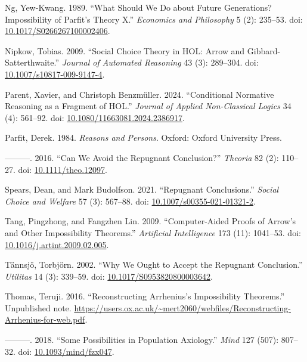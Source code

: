 \documentclass[
  11pt,
  letterpaper,
  DIV=11,
  numbers=noendperiod,
  twoside]{scrartcl}
\newlength{\cslhangindent}
\newenvironment{CSLReferences}[2] %
 {\begin{list}{}{%
  \setlength{\itemindent}{0pt}
  \setlength{\leftmargin}{0pt}
  \setlength{\parsep}{0pt}
  \ifodd #1
   \setlength{\leftmargin}{\cslhangindent}
   \setlength{\itemindent}{-1\cslhangindent}
  \fi
  \setlength{\itemsep}{#2\baselineskip}}}
 {\end{list}}
\begin{document}
\begin{CSLReferences}{1}{0}
Ng, Yew-Kwang. 1989. {``What Should We Do about Future Generations?
{I}mpossibility of {P}arfit's {T}heory {X}.''} \emph{Economics and
Philosophy} 5 (2): 235--53. doi:
\href{https://doi.org/10.1017/S0266267100002406}{10.1017/S0266267100002406}.

Nipkow, Tobias. 2009. {``Social Choice Theory in {HOL}: {A}rrow and
{G}ibbard-{S}atterthwaite.''} \emph{Journal of Automated Reasoning} 43
(3): 289--304. doi:
\href{https://doi.org/10.1007/s10817-009-9147-4}{10.1007/s10817-009-9147-4}.

Parent, Xavier, and Christoph Benzmüller. 2024. {``Conditional Normative
Reasoning as a Fragment of {HOL}.''} \emph{Journal of Applied
Non-Classical Logics} 34 (4): 561--92. doi:
\href{https://doi.org/10.1080/11663081.2024.2386917}{10.1080/11663081.2024.2386917}.

Parfit, Derek. 1984. \emph{Reasons and Persons}. Oxford: Oxford
University Press.

---------. 2016. {``Can We Avoid the Repugnant Conclusion?''}
\emph{Theoria} 82 (2): 110--27. doi:
\href{https://doi.org/10.1111/theo.12097}{10.1111/theo.12097}.

Spears, Dean, and Mark Budolfson. 2021. {``Repugnant Conclusions.''}
\emph{Social Choice and Welfare} 57 (3): 567--88. doi:
\href{https://doi.org/10.1007/s00355-021-01321-2}{10.1007/s00355-021-01321-2}.

Tang, Pingzhong, and Fangzhen Lin. 2009. {``Computer-Aided Proofs of
{A}rrow's and Other Impossibility Theorems.''} \emph{Artificial
Intelligence} 173 (11): 1041--53. doi:
\href{https://doi.org/10.1016/j.artint.2009.02.005}{10.1016/j.artint.2009.02.005}.

Tännsjö, Torbjörn. 2002. {``Why We Ought to Accept the Repugnant
Conclusion.''} \emph{Utilitas} 14 (3): 339--59. doi:
\href{https://doi.org/10.1017/S0953820800003642}{10.1017/S0953820800003642}.

Thomas, Teruji. 2016. {``Reconstructing {A}rrhenius's Impossibility
Theorems.''} Unpublished note.
\url{https://users.ox.ac.uk/~mert2060/webfiles/Reconstructing-Arrhenius-for-web.pdf}.

---------. 2018. {``Some Possibilities in Population Axiology.''}
\emph{Mind} 127 (507): 807--32. doi:
\href{https://doi.org/10.1093/mind/fzx047}{10.1093/mind/fzx047}.


\end{CSLReferences}
\end{document}
